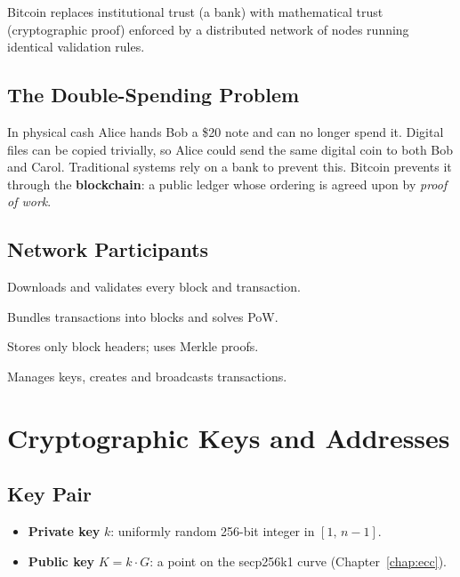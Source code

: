 \documentclass[12pt,a4paper,openany]{book}
\theoremstyle{definition}
\theoremstyle{plain}
\theoremstyle{remark}
\begin{document}
\begin{keyinsight}
  Bitcoin replaces institutional trust (a bank) with mathematical trust
  (cryptographic proof) enforced by a distributed network of nodes
  running identical validation rules.
\end{keyinsight}

\subsection{The Double-Spending Problem}

In physical cash Alice hands Bob a \$20 note and can no longer spend it.
Digital files can be copied trivially, so Alice could send the same
digital coin to both Bob and Carol.  Traditional systems rely on a bank
to prevent this.  Bitcoin prevents it through the \textbf{blockchain}: a
public ledger whose ordering is agreed upon by \emph{proof of work}.

\subsection{Network Participants}

\begin{description}[leftmargin=2.2cm,style=sameline]
  \item[Full node]   Downloads and validates every block and transaction.
  \item[Miner]       Bundles transactions into blocks and solves PoW.
  \item[Light client] Stores only block headers; uses Merkle proofs.
  \item[Wallet]      Manages keys, creates and broadcasts transactions.
\end{description}

\section{Cryptographic Keys and Addresses}

\subsection{Key Pair}

\begin{itemize}
  \item \textbf{Private key} $k$: uniformly random 256-bit integer in $[1,\,n-1]$.
  \item \textbf{Public key} $K = k\cdot G$: a point on the secp256k1 curve
        (Chapter~\ref{chap:ecc}).
\end{itemize}
\end{document}
